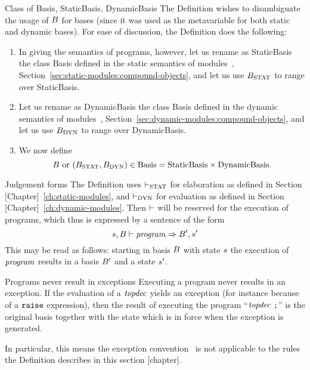 \begin{definition}{Class of Basis, StaticBasis, DynamicBasis}
The Definition wishes to disambiguate the usage of $B$ for bases (since
it was used as the metavariable for both static and dynamic bases).
For ease of discussion, the Definition does the following:
\begin{enumerate}
\item In giving the semantics of programs, however, let us rename as 
\mbox{StaticBasis} the class  Basis defined in the static
semantics of modules~, Section~\ref{sec:static-modules:compound-objects},
and let us use $B_{\rm STAT}$ to range over StaticBasis.
\item Let us rename as  \mbox{DynamicBasis} the class Basis defined in the
dynamic semantics of modules~, Section~\ref{sec:dynamic-modules:compound-objects},
and let us use $B_{\rm DYN}$ to range over \mbox{DynamicBasis}.
\item We now define
  \begin{equation*}
\B\ {\rm or} \ (\Bstat,\Bdyn)\in{\rm Basis}={\rm Static Basis}
\times {\rm DynamicBasis}.
  \end{equation*}
\end{enumerate}
\end{definition}

\begin{definition}{Judgement forms}
The Definition uses $\vdash_{\rm STAT}$ for elaboration as defined in 
Section [Chapter]~\ref{ch:static-modules}, and $\vdash_{\rm DYN}$ for evaluation
as defined in Section [Chapter]~\ref{ch:dynamic-modules}.
Then $\vdash$ will be reserved for the execution of
programs, which thus is expressed by a sentence of the
form
\begin{equation*}
s,B\vdash\textit{program\/}\Rightarrow B',s'
\end{equation*}
This may be read as follows: 
starting in basis $B$ with state $s$ the execution of
$\textit{program\/}$ results in a basis $B'$ and a state $s'$.
\end{definition}

\begin{clause}{Programs never result in exceptions}
Executing a program never results in an exception. If the evaluation of
a $\textit{topdec\/}$ yields an exception (for instance because of a ${\tt raise}$ expression),
then the result of executing the program ``$\topdec\ \mbox{\ml{;}}$''
is the original basis together with the state which is in force when the
exception is generated.

In particular, this means the exception convention~
is not applicable to the rules the Definition describes in this section
[chapter]. 
\end{clause}

